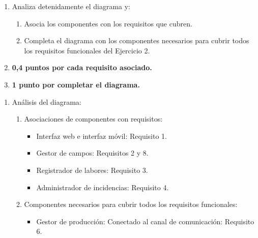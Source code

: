 \begin{enunciado}

    \begin{enumerate}
        \item Analiza detenidamente el diagrama y:
        \begin{enumerate}
            \item Asocia los componentes con los requisitos que cubren.
            \item Completa el diagrama con los componentes necesarios para cubrir todos los requisitos
            funcionales del Ejercicio 2.
        \end{enumerate}
        \item \textbf{0,4 puntos por cada requisito asociado.}
        \item \textbf{1 punto por completar el diagrama.}
    \end{enumerate}

\end{enunciado}

\begin{solucion}
    \begin{enumerate}
        \item Análisis del diagrama:
        \begin{enumerate}
            \item Asociaciones de componentes con requisitos:
            \begin{itemize}
                \item Interfaz web e interfaz móvil: Requisito 1.
                \item Gestor de campos: Requisitos 2 y 8.
                \item Registrador de labores: Requisito 3.
                \item Administrador de incidencias: Requisito 4.
            \end{itemize}

            \item Componentes necesarios para cubrir todos los requisitos funcionales:
            \begin{itemize}
                \item Gestor de producción: Conectado al canal de comunicación: Requisito 6.
            \end{itemize}
        \end{enumerate}
    \end{enumerate}
\end{solucion}